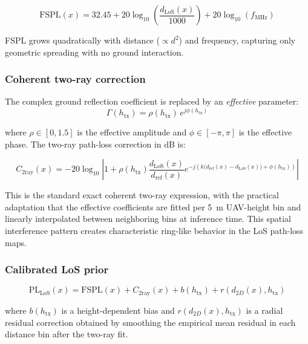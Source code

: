 \begin{equation}
\mathrm{FSPL}(x) = 32.45 + 20\log_{10}\!\left(\frac{d_{\mathrm{LoS}}(x)}{1000}\right) + 20\log_{10}(f_{\mathrm{MHz}})
\label{eq:fspl_detail}
\end{equation}

FSPL grows quadratically with distance ($\propto d^2$) and frequency, capturing only geometric spreading with no ground interaction.

\subsubsection{Coherent two-ray correction}

The complex ground reflection coefficient is replaced by an \emph{effective} parameter:
\begin{equation}
\Gamma(h_{\mathrm{tx}}) = \rho(h_{\mathrm{tx}})\,e^{j\phi(h_{\mathrm{tx}})}
\end{equation}

where $\rho \in [0, 1.5]$ is the effective amplitude and $\phi \in [-\pi, \pi]$ is the effective phase. The two-ray path-loss correction in dB is:

\begin{equation}
C_{\mathrm{2ray}}(x) = -20\log_{10}\left|1 + \rho(h_{\mathrm{tx}})\frac{d_{\mathrm{LoS}}(x)}{d_{\mathrm{ref}}(x)} e^{-j\left(k\bigl(d_{\mathrm{ref}}(x)-d_{\mathrm{LoS}}(x)\bigr)+\phi(h_{\mathrm{tx}})\right)}\right|
\label{eq:c2ray_detail}
\end{equation}

This is the standard exact coherent two-ray expression, with the practical
adaptation that the effective coefficients are fitted per 5~m UAV-height bin
and linearly interpolated between neighboring bins at inference time. This
spatial interference pattern creates characteristic ring-like behavior in the
LoS path-loss maps.

\subsubsection{Calibrated LoS prior}

\begin{equation}
\mathrm{PL}_{\mathrm{LoS}}(x) = \mathrm{FSPL}(x) + C_{\mathrm{2ray}}(x) + b(h_{\mathrm{tx}}) + r(d_{2D}(x), h_{\mathrm{tx}})
\label{eq:pl_los_detail}
\end{equation}

where $b(h_{\mathrm{tx}})$ is a height-dependent bias and $r(d_{2D}(x), h_{\mathrm{tx}})$ is a radial residual correction obtained by smoothing the empirical mean residual in each distance bin after the two-ray fit.

